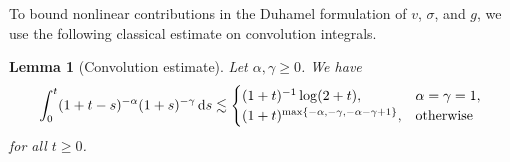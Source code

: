 \documentclass[12pt,oneside,a4paper,reqno]{amsart}
\numberwithin{equation}{section}
\newtheorem{lemma}[theorem]{Lemma}
\theoremstyle{definition}
\theoremstyle{remark}
\newcommand{\rd}{{\,\rm{d}}}
\DeclarePairedDelimiter{\cur}{\{}{\}}
\begin{document}
To bound nonlinear contributions in the Duhamel formulation of $v$, $\sigma$, and $g$, we use the following classical estimate on convolution integrals.

\begin{lemma}[Convolution estimate]
    \label{lem:convolution}
    Let $\alpha,\gamma \geq 0$. We have
    \begin{align*}
    \int_0^t (1+t-s)^{-\alpha}(1+s)^{-\gamma} \rd s \lesssim \begin{cases}
            (1+t)^{-1}\log(2+t), & \alpha = \gamma = 1, \\
            (1+t)^{\max\cur{-\alpha,-\gamma,-\alpha-\gamma + 1}}, & \text{\normalfont otherwise}
        \end{cases}
    \end{align*}
    for all $t \geq 0$.
\end{lemma}
\end{document}
